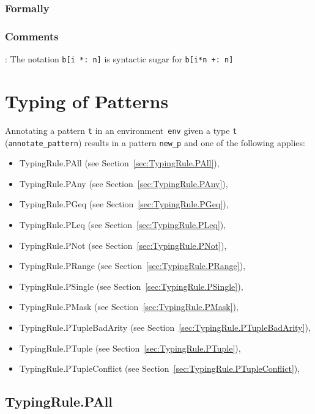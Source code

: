 \documentclass{book}
\begin{document}
\begin{emptyformal}
    \subsection{Formally}
\end{emptyformal}

\subsection{Comments}
    : The notation \texttt{b[i *: n]} is syntactic sugar for \texttt{b[i*n +: n]}

\chapter{Typing of Patterns}

Annotating a pattern \texttt{t} in an environment~\texttt{env} given a type \texttt{t} (\texttt{annotate\_pattern}) results in a pattern \texttt{new\_p} and one of the following applies:
\begin{itemize}
\item TypingRule.PAll (see Section~\ref{sec:TypingRule.PAll}),
\item TypingRule.PAny (see Section~\ref{sec:TypingRule.PAny}),
\item TypingRule.PGeq (see Section~\ref{sec:TypingRule.PGeq}),
\item TypingRule.PLeq (see Section~\ref{sec:TypingRule.PLeq}),
\item TypingRule.PNot (see Section~\ref{sec:TypingRule.PNot}),
\item TypingRule.PRange (see Section~\ref{sec:TypingRule.PRange}),
\item TypingRule.PSingle (see Section~\ref{sec:TypingRule.PSingle}),
\item TypingRule.PMask (see Section~\ref{sec:TypingRule.PMask}),
\item TypingRule.PTupleBadArity (see Section~\ref{sec:TypingRule.PTupleBadArity}),
\item TypingRule.PTuple (see Section~\ref{sec:TypingRule.PTuple}),
\item TypingRule.PTupleConflict (see Section~\ref{sec:TypingRule.PTupleConflict}),
\end{itemize}

\section{TypingRule.PAll \label{sec:TypingRule.PAll}}
\end{document}
